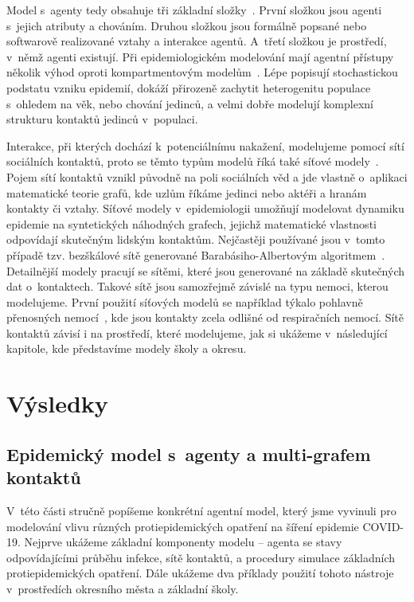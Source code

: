 Model s~agenty tedy obsahuje tři základní složky~\cite{Macal14}. První složkou jsou agenti s~jejich atributy a chováním. Druhou složkou jsou formálně popsané nebo softwarově realizované vztahy a interakce agentů. A~třetí složkou je prostředí, v~němž agenti existují.   
Při epidemiologickém modelování mají agentní přístupy několik výhod oproti kompartmentovým modelům~\cite{Zino2021}. Lépe popisují stochastickou podstatu vzniku epidemií, dokáží přirozeně zachytit heterogenitu populace s~ohledem na věk, nebo chování jedinců, a velmi dobře modelují komplexní strukturu kontaktů jedinců v~populaci. 

Interakce, při kterých dochází k~potenciálnímu nakažení, modelujeme pomocí sítí sociálních kontaktů, proto se těmto typům modelů říká také síťové modely~\cite{Keeling2005}. Pojem sítí kontaktů vznikl původně na poli sociálních věd a jde vlastně o~aplikaci matematické teorie grafů, kde uzlům říkáme jedinci nebo aktéři a hranám kontakty či vztahy. Síťové modely v~epidemiologii umožňují modelovat dynamiku epidemie na syntetických náhodných grafech, jejichž matematické vlastnosti odpovídají skutečným lidským kontaktům. Nejčastěji používané jsou v~tomto případě tzv. bezškálové sítě generované Barabásiho-Albertovým algoritmem~\cite{Barabasi99}. Detailnější modely pracují se sítěmi, které jsou generované na základě skutečných dat o~kontaktech. Takové sítě jsou samozřejmě závislé na typu nemoci, kterou modelujeme. První použití síťových modelů se například týkalo pohlavně přenosných nemocí~\cite{Klovdahl85}, kde jsou kontakty zcela odlišné od respiračních nemocí. Sítě kontaktů závisí i na prostředí, které modelujeme, jak si ukážeme v~následující kapitole, kde představíme modely školy a okresu.


\section*{Výsledky} 

\subsection*{Epidemický model s~agenty a multi-grafem kontaktů}

V~této části stručně popíšeme konkrétní agentní model, který jsme vyvinuli pro modelování vlivu různých protiepidemických opatření na šíření epidemie COVID-19. Nejprve ukážeme základní komponenty modelu -- agenta se stavy odpovídajícími průběhu infekce, sítě kontaktů, a procedury simulace základních protiepidemických opatření. Dále ukážeme dva příklady použití tohoto nástroje v~prostředích okresního města a základní školy.  


